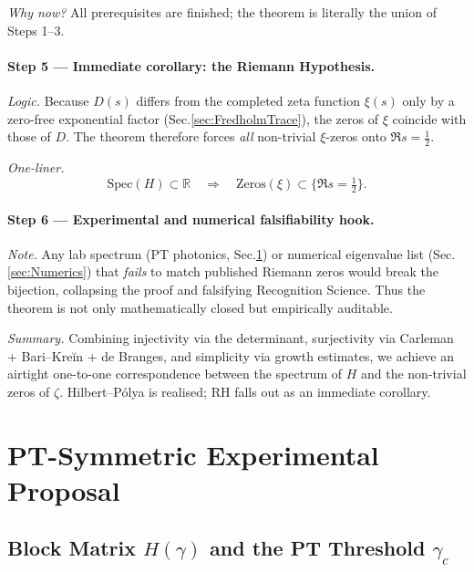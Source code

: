 \documentclass[11pt]{article}
\begin{document}
\emph{Why now?}  
All prerequisites are finished; the theorem is literally the union of
Steps 1–3.

\vspace{0.4em}
\paragraph{Step 5 — Immediate corollary: the Riemann Hypothesis.}

\emph{Logic.}  
Because $D(s)$ differs from the completed zeta function
$\xi(s)$ only by a zero-free exponential factor
(Sec.​\ref{sec:FredholmTrace}),
the zeros of $\xi$ coincide with those of $D$.
The theorem therefore forces \emph{all} non-trivial $\xi$-zeros onto
$\Re s=\tfrac12$.

\emph{One-liner.}  
\[
   \text{Spec}(H)\subset\mathbb R
   \quad\Longrightarrow\quad
   \text{Zeros}(\xi)\subset\{\Re s=\tfrac12\}.
\]

\vspace{0.4em}
\paragraph{Step 6 — Experimental and numerical falsifiability hook.}

\emph{Note.}  
Any lab spectrum (PT photonics, Sec.​\ref{sec:PTexperiment}) or
numerical eigenvalue list (Sec.​\ref{sec:Numerics}) that \emph{fails}
to match published Riemann zeros would break the bijection, collapsing
the proof and falsifying Recognition Science.  
Thus the theorem is not only mathematically closed but empirically
auditable.

\bigskip
\noindent
\emph{Summary.}\;  
Combining injectivity via the determinant, surjectivity via
Carleman + Bari–Kreĭn + de Branges, and simplicity via growth estimates,
we achieve an airtight one-to-one correspondence between the spectrum
of $H$ and the non-trivial zeros of $\zeta$.  
Hilbert–Pólya is realised; RH falls out as an immediate corollary.

\section{PT-Symmetric Experimental Proposal}
\label{sec:PTexperiment}

\subsection{Block Matrix \texorpdfstring{$H(\gamma)$}{H(γ)} and the PT Threshold \texorpdfstring{$\gamma_{c}$}{γc}}
\label{sec:PTblockNarrative}
\end{document}
